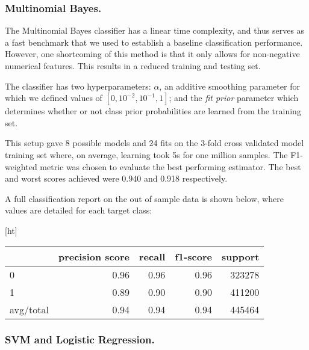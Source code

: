 \subsubsection{Multinomial Bayes.}

The Multinomial Bayes classifier has a linear time complexity, and thus serves as a fast benchmark that we used to establish a baseline classification performance. However, one shortcoming of this method is that it only allows for non-negative numerical features. This results in a reduced training and testing set.

The classifier has two hyperparameters: $\alpha$, an additive smoothing parameter for which we defined values of $[0,{10^{-2}},{10^{-1}},1]$; and the \textit{fit prior} parameter which determines whether or not class prior probabilities are learned from the training set.

This setup gave 8 possible models and 24 fits on the 3-fold cross validated model training set where, on average, learning took 5s for one million samples. The F1-weighted metric was chosen to evaluate the best performing estimator.
The best and worst scores achieved were 0.940 and 0.918 respectively.

A full classification report on the out of sample data is shown below, where values are detailed for each target class:
\begin{table}\label{tab:classification_report}[ht]
	\centering
	\begin{tabular}{ l r r r r }
		\toprule
		{ } & precision score & recall & f1-score & support \\
		\midrule
		0 		 & 0.96 & 0.96 & 0.96 & 323278 \\
		1		 & 0.89 & 0.90 & 0.90 & 411200 \\
		avg/total & 0.94 & 0.94 & 0.94 & 445464 \\
		\bottomrule
	\end{tabular}
\end{table}


\subsubsection{SVM and Logistic Regression.}

